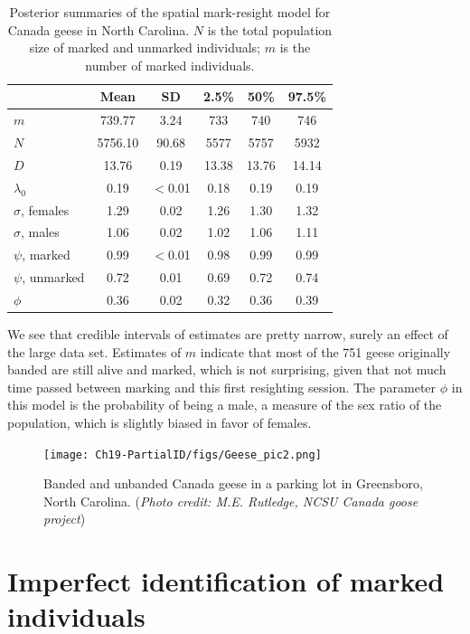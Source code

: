 \begin{table}
\label{partialID.tab.geese}
\centering
  \caption{Posterior summaries of the spatial mark-resight model for Canada geese in North Carolina. $N$ is the total population size of marked and unmarked individuals; $m$ is the number of marked individuals.}
  \begin{tabular}{lccccc}
             \hline
       &   Mean &   SD &  2.5\% & 50\% & 97.5\% \\
           \hline
$m$      &  739.77 & 3.24  &  733 & 740  & 746 \\
$N$      & 5756.10 & 90.68 & 5577 & 5757 & 5932 \\
$D$       &  13.76 & 0.19 & 13.38 & 13.76 & 14.14 \\
$\lambda_0$ &  0.19 & $<$0.01 & 0.18 & 0.19 & 0.19 \\
$\sigma$, females  &  1.29 & 0.02 & 1.26 & 1.30 & 1.32 \\
$\sigma$, males  &  1.06 & 0.02 & 1.02 & 1.06 & 1.11 \\
$\psi$, marked    & 0.99 & $<$0.01 & 0.98  & 0.99  & 0.99 \\
$\psi$, unmarked   & 0.72  & 0.01 & 0.69 & 0.72  & 0.74 \\
$\phi$     &  0.36 & 0.02 & 0.32 & 0.36 & 0.39 \\
    \hline
  \end{tabular}
\end{table}

We see that credible intervals of estimates are pretty narrow, surely an effect of the large data set. Estimates of $m$ indicate that most of the 751 geese originally banded are still alive and marked, which is not surprising, given that not much time passed between marking and this first resighting session. The parameter $\phi$ in this model is the probability of being a male, a measure of the sex ratio of the population, which is slightly biased in favor of females.

\begin{figure}[ht]
  \centering
  \texttt{[image: Ch19-PartialID/figs/Geese\_pic2.png]}
  \caption{Banded and unbanded Canada geese in a parking lot in Greensboro, North Carolina.
({\it Photo credit: M.E. Rutledge, NCSU Canada goose project})}
  \label{partialID.fig.geese}
\end{figure}

\section  {Imperfect identification of marked individuals}
\label{partialID.sec.IDrate}

